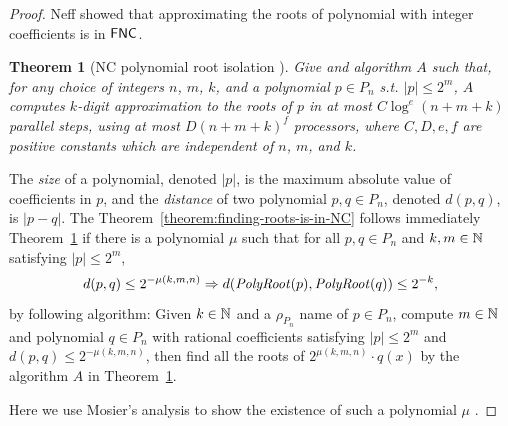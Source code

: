 \documentclass{article}
\newtheorem{theorem}{Theorem}[section]
\theoremstyle{definition}
\theoremstyle{remark}
\begin{document}
\begin{proof}
Neff showed that approximating the roots of polynomial with integer coefficients
is in $\mathsf{FNC}$.
\begin{theorem}
[NC polynomial root isolation \cite{neff1994specified}]\label{theorem:neff1994}
Give and algorithm $A$ such that,
for any choice of integers $n$, $m$, $k$, and a polynomial $p \in P_n$
s.t. $|p| \le 2^m$,
$A$ computes $k$-digit approximation to the roots of $p$ 
in at most $C \log^e(n + m + k)$ parallel steps, 
using at most $D(n + m + k)^f$ processors, where $C, D, e, f$ are positive
constants which are independent of $n$, $m$, and $k$.
\end{theorem}
The \emph{size} of a polynomial, denoted $|p|$, is the maximum absolute value
 of coefficients in $p$, and the \emph{distance} of
two polynomial $p, q \in P_n$, denoted $d(p, q)$, is $|p-q|$.
The Theorem~\ref{theorem:finding-roots-is-in-NC} follows immediately
Theorem~\ref{theorem:neff1994}
if there is a polynomial $\mu$ such that for all $p, q \in P_n$ and
$k, m \in \mathbb N$ satisfying $|p| \le 2^m$,
\begin{equation}
  d(p, q) \le 2^{-\mu(k, m, n)} \Rightarrow d(\mathit{PolyRoot}(p), \mathit{PolyRoot}(q)) \le 2^{-k},
\end{equation}
by following algorithm:
Given $k \in \mathbb N$ and a $\rho_{P_n}$ name of $p \in P_n$, 
compute $m \in \mathbb N$ and polynomial $q \in {P_n}$ with rational coefficients
satisfying $|p| \le 2^m$ and $d(p, q) \le 2^{-\mu(k, m, n)}$,
then find all the roots of $2^{\mu(k, m, n)} \cdot q(x)$ by the algorithm $A$ 
in Theorem~\ref{theorem:neff1994}.


Here we use Mosier's analysis to show the existence of such a polynomial $\mu$
\cite{mosier1986root}.


\end{proof}
\end{document}
